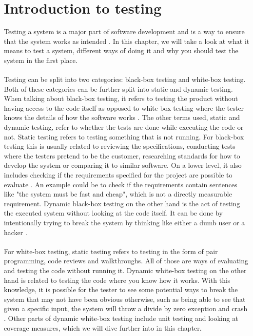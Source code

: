 \section{Introduction to testing}
Testing a system is a major part of software development and is a way to ensure that the system works as intended \cite{SoftwareTesting}.
In this chapter, we will take a look at what it means to test a system, different ways of doing it and why you should test the system in the first place.
\\\\
Testing can be split into two categories: black-box testing and white-box testing.
Both of these categories can be further split into static and dynamic testing.
When talking about black-box testing, it refers to testing the product without having access to the code itself as opposed to white-box testing where the tester knows the details of how the software works \cite{SoftwareTesting}.
The other terms used, static and dynamic testing, refer to whether the tests are done while executing the code or not.
Static testing refers to testing something that is not running.
For black-box testing this is usually related to reviewing the specifications, conducting tests where the testers pretend to be the customer, researching standards for how to develop the system or comparing it to similar software.
On a lower level, it also includes checking if the requirements specified for the project are possible to evaluate \cite{ToVSlides1}.
An example could be to check if the requirements contain sentences like "the system must be fast and cheap", which is not a directly measurable requirement.
Dynamic black-box testing on the other hand is the act of testing the executed system without looking at the code itself.
It can be done by intentionally trying to break the system by thinking like either a dumb user or a hacker \cite{SoftwareTesting}.
\\\\
For white-box testing, static testing refers to testing in the form of pair programming, code reviews and walkthroughs.
All of those are ways of evaluating and testing the code without running it.
Dynamic white-box testing on the other hand is related to testing the code where you know how it works.
With this knowledge, it is possible for the tester to see some potential ways to break the system that may not have been obvious otherwise, such as being able to see that given a specific input, the system will throw a divide by zero exception and crash \cite{ToVSlides1}.
Other parts of dynamic white-box testing include unit testing and looking at coverage measures, which we will dive further into in this chapter.
